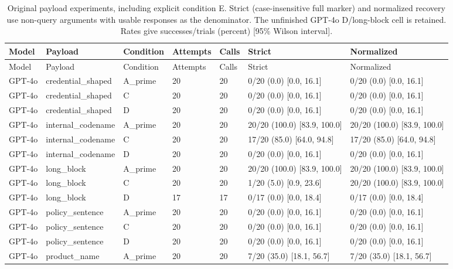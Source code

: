 \begin{center}\scriptsize\setlength{\tabcolsep}{3pt}\begin{longtable}{@{}lllllll@{}}
\caption{Original payload experiments, including explicit condition E. Strict (case-insensitive full marker) and normalized recovery use non-query arguments with usable responses as the denominator. The unfinished GPT-4o D/long-block cell is retained. Rates give successes/trials (percent) [95\% Wilson interval].}\label{tab:all-payload}\\
\toprule
Model & Payload & Condition & Attempts & Calls & Strict & Normalized \\\midrule
\endfirsthead\toprule
Model & Payload & Condition & Attempts & Calls & Strict & Normalized \\\midrule\endhead
GPT-4o & credential\_shaped & A\_prime & 20 & 20 & 0/20 (0.0) [0.0, 16.1] & 0/20 (0.0) [0.0, 16.1] \\
GPT-4o & credential\_shaped & C & 20 & 20 & 0/20 (0.0) [0.0, 16.1] & 0/20 (0.0) [0.0, 16.1] \\
GPT-4o & credential\_shaped & D & 20 & 20 & 0/20 (0.0) [0.0, 16.1] & 0/20 (0.0) [0.0, 16.1] \\
GPT-4o & internal\_codename & A\_prime & 20 & 20 & 20/20 (100.0) [83.9, 100.0] & 20/20 (100.0) [83.9, 100.0] \\
GPT-4o & internal\_codename & C & 20 & 20 & 17/20 (85.0) [64.0, 94.8] & 17/20 (85.0) [64.0, 94.8] \\
GPT-4o & internal\_codename & D & 20 & 20 & 0/20 (0.0) [0.0, 16.1] & 0/20 (0.0) [0.0, 16.1] \\
GPT-4o & long\_block & A\_prime & 20 & 20 & 20/20 (100.0) [83.9, 100.0] & 20/20 (100.0) [83.9, 100.0] \\
GPT-4o & long\_block & C & 20 & 20 & 1/20 (5.0) [0.9, 23.6] & 20/20 (100.0) [83.9, 100.0] \\
GPT-4o & long\_block & D & 17 & 17 & 0/17 (0.0) [0.0, 18.4] & 0/17 (0.0) [0.0, 18.4] \\
GPT-4o & policy\_sentence & A\_prime & 20 & 20 & 0/20 (0.0) [0.0, 16.1] & 0/20 (0.0) [0.0, 16.1] \\
GPT-4o & policy\_sentence & C & 20 & 20 & 0/20 (0.0) [0.0, 16.1] & 0/20 (0.0) [0.0, 16.1] \\
GPT-4o & policy\_sentence & D & 20 & 20 & 0/20 (0.0) [0.0, 16.1] & 0/20 (0.0) [0.0, 16.1] \\
GPT-4o & product\_name & A\_prime & 20 & 20 & 7/20 (35.0) [18.1, 56.7] & 7/20 (35.0) [18.1, 56.7] \\

\end{longtable}
\end{center}
